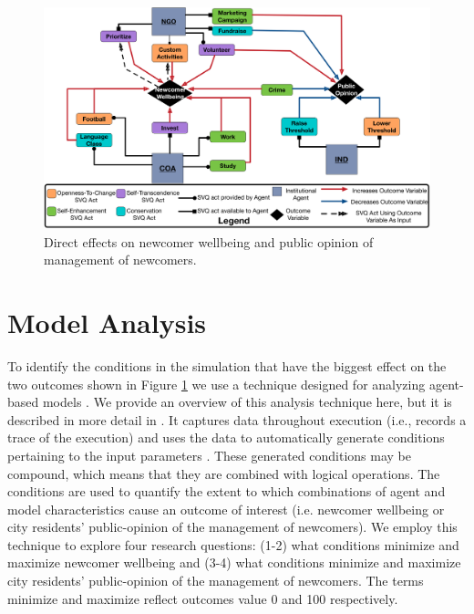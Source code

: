 \documentclass{scspaperproc}
\theoremstyle{scsthe}
\begin{document}
\begin{figure}[htb]
{
\centering
\includegraphics[width=0.75\columnwidth]{Newcomer-Wellbeing-Causal.png}
\caption{Direct effects on newcomer wellbeing and public opinion of management of newcomers.}
\label{fig:model-dynamics}
}
\end{figure}

\section{Model Analysis}
To identify the conditions in the simulation that have the biggest effect on the two outcomes shown in Figure \ref{fig:model-dynamics} we use a technique designed for analyzing agent-based models \cite{gore2017applying}. We provide an overview of this analysis technique here, but it is described in more detail in \cite{gore2015statistical}. It captures data throughout execution (i.e., records a trace of the execution) and uses the data to automatically generate conditions pertaining to the input parameters \cite{gore2017augmenting}. These generated conditions may be compound, which means that they are combined with logical operations. The conditions are used to quantify the extent to which combinations of agent and model characteristics cause an outcome of interest (i.e. newcomer wellbeing or city residents' public-opinion of the management of newcomers). We employ this technique to explore four research questions: (1-2) what conditions minimize and maximize newcomer wellbeing and (3-4) what conditions minimize and maximize city residents' public-opinion of the management of newcomers.  The terms minimize and maximize reflect outcomes value 0 and 100 respectively. 
\end{document}
